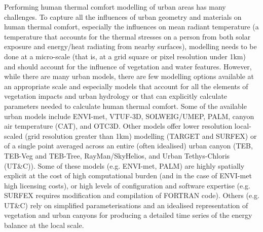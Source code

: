 Performing human thermal comfort modelling of urban areas has many challenges. To capture all the influences of urban geometry and materials on human thermal comfort, especially the influences on mean radiant temperature\cite{Kantor2011} (a temperature that accounts for the thermal stresses on a person from both solar exposure and energy/heat radiating from nearby surfaces), modelling needs to be done at a micro-scale (that is, at a grid square or pixel resolution under 1km) and should account for the influence of vegetation and water features. However, while there are many urban models, there are few modelling options available at an appropriate scale and especially models that account for all the elements of vegetation impacts and urban hydrology or that can explicitly calculate parameters needed to calculate human thermal comfort. Some of the available urban models include ENVI-met\cite{Bruse1999}, VTUF-3D\cite{Nice2018a}, SOLWEIG/UMEP\cite{Lindberg2018}, PALM\cite{Dominik2019}, canyon air temperature (CAT)\cite{Erell2006}, and OTC3D\cite{Nazarian2018}. Other models offer lower resolution local-scaled (grid resolution greater than 1km) modelling (TARGET\cite{Broadbent2019c} and SURFEX\cite{Masson2013}) or of a single point averaged across an entire (often idealised) urban canyon (TEB\cite{Masson2002a},  TEB-Veg and TEB-Tree\cite{Lemonsu2012,Redon2020}, RayMan\cite{Matzarakis2010}/SkyHelios\cite{Matzarakis2011}, and Urban Tethys-Chloris (UT\&C)\cite{Meili2020}). Some of these models (e.g. ENVI-met, PALM) are highly spatially explicit at the cost of high computational burden (and in the case of ENVI-met high licensing costs), or high levels of configuration and software expertise (e.g. SURFEX requires modification and compilation of FORTRAN code). Others (e.g. UT\&C) rely on simplified parameterisations and an idealised representation of vegetation and urban canyons for producing a detailed time series of the energy balance at the local scale. 



